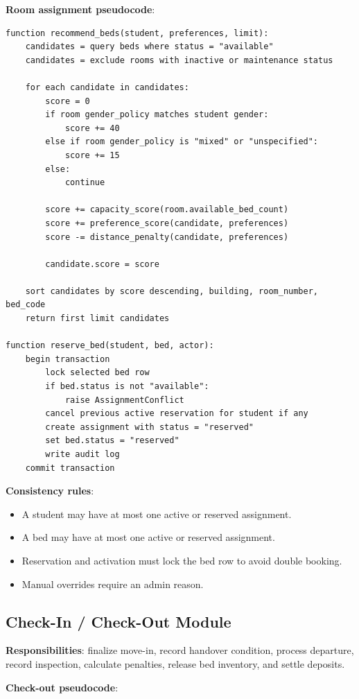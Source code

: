 \documentclass[11pt,a4paper]{article}
\begin{document}
\textbf{Room assignment pseudocode}:

\begin{verbatim}
function recommend_beds(student, preferences, limit):
    candidates = query beds where status = "available"
    candidates = exclude rooms with inactive or maintenance status

    for each candidate in candidates:
        score = 0
        if room gender_policy matches student gender:
            score += 40
        else if room gender_policy is "mixed" or "unspecified":
            score += 15
        else:
            continue

        score += capacity_score(room.available_bed_count)
        score += preference_score(candidate, preferences)
        score -= distance_penalty(candidate, preferences)

        candidate.score = score

    sort candidates by score descending, building, room_number, bed_code
    return first limit candidates

function reserve_bed(student, bed, actor):
    begin transaction
        lock selected bed row
        if bed.status is not "available":
            raise AssignmentConflict
        cancel previous active reservation for student if any
        create assignment with status = "reserved"
        set bed.status = "reserved"
        write audit log
    commit transaction
\end{verbatim}

\textbf{Consistency rules}:
\begin{itemize}
  \item A student may have at most one active or reserved assignment.
  \item A bed may have at most one active or reserved assignment.
  \item Reservation and activation must lock the bed row to avoid double booking.
  \item Manual overrides require an admin reason.
\end{itemize}

\subsection{Check-In / Check-Out Module}
\textbf{Responsibilities}: finalize move-in, record handover condition, process departure, record inspection, calculate penalties, release bed inventory, and settle deposits.

\textbf{Check-out pseudocode}:
\end{document}
